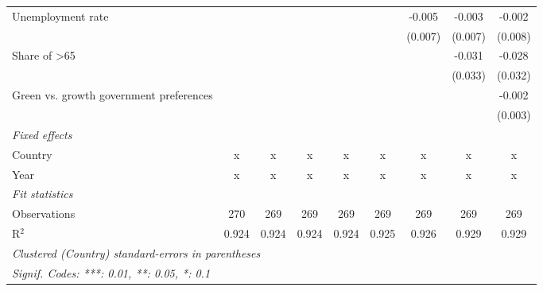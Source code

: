 \begin{table}[htbp]
\begin{tabular}{lcccccccc}
      Unemployment rate                                                 &         &         &         &         &         & -0.005  & -0.003  & -0.002\\   
                                                                        &         &         &         &         &         & (0.007) & (0.007) & (0.008)\\   
      Share of >65                                                      &         &         &         &         &         &         & -0.031  & -0.028\\   
                                                                        &         &         &         &         &         &         & (0.033) & (0.032)\\   
      Green vs. growth government preferences                           &         &         &         &         &         &         &         & -0.002\\   
                                                                        &         &         &         &         &         &         &         & (0.003)\\   
      \emph{Fixed effects}\\
      Country                                                           & x       & x       & x       & x       & x       & x       & x       & x\\  
      Year                                                              & x       & x       & x       & x       & x       & x       & x       & x\\  
      \midrule \emph{Fit statistics}\\
      Observations                                                      & 270     & 269     & 269     & 269     & 269     & 269     & 269     & 269\\  
      R$^2$                                                             & 0.924   & 0.924   & 0.924   & 0.924   & 0.925   & 0.926   & 0.929   & 0.929\\  
      \midrule
      \multicolumn{9}{l}{\emph{Clustered (Country) standard-errors in parentheses}}\\
      \multicolumn{9}{l}{\emph{Signif. Codes: ***: 0.01, **: 0.05, *: 0.1}}\\
   \end{tabular}
\end{table}


